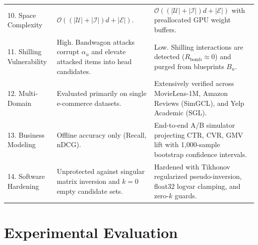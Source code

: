 \documentclass[10pt,journal]{IEEEtran}
\begin{document}
\begin{table}[!t]
{\begin{tabular}{p{3.2cm}p{6.4cm}p{6.8cm}}
10. Space Complexity & $\mathcal{O}((|\mathcal{U}| + |\mathcal{I}|) d + |\mathcal{E}|)$. & $\mathcal{O}((|\mathcal{U}| + |\mathcal{I}|) d + |\mathcal{E}|)$ with preallocated GPU weight buffers. \\
11. Shilling Vulnerability & High. Bandwagon attacks corrupt $\alpha_u$ and elevate attacked items into head candidates. & Low. Shilling interactions are detected ($R_{\text{bomb}} \approx 0$) and purged from blueprints $B_u$. \\
12. Multi-Domain & Evaluated primarily on single e-commerce datasets. & Extensively verified across MovieLens-1M, Amazon Reviews (SimGCL), and Yelp Academic (SGL). \\
13. Business Modeling & Offline accuracy only (Recall, nDCG). & End-to-end A/B simulator projecting CTR, CVR, GMV lift with 1,000-sample bootstrap confidence intervals. \\
14. Software Hardening & Unprotected against singular matrix inversion and $k=0$ empty candidate sets. & Hardened with Tikhonov regularized pseudo-inversion, float32 logvar clamping, and zero-$k$ guards. \\
\bottomrule
\end{tabular}}
\end{table}

\section{Experimental Evaluation}
\label{sec:experiments}

\begin{table}[!t]
\caption{Dataset Characteristics, Graph Topology, and Bandwagon Attack Injection Statistics.}
\label{tab:dataset_topology}
\centering
\setlength{\tabcolsep}{3.5pt}
\end{table}
\end{document}
